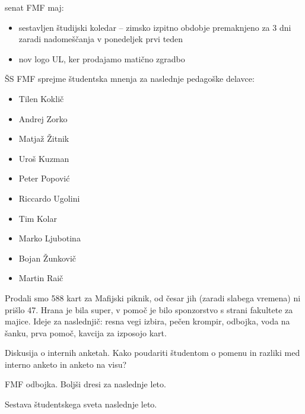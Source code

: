 \documentclass{seja}
\begin{document}
\begin{ad}
\begin{itemize}
    \end{itemize}

    senat FMF maj:

    \begin{itemize}

      \item sestavljen študijski koledar -- zimsko izpitno obdobje premaknjeno za 3 dni zaradi 
      nadomeščanja v ponedeljek prvi teden

      \item nov logo UL, ker prodajamo matično zgradbo

    \end{itemize}

    
    \item

    ŠS FMF sprejme študentska mnenja za naslednje pedagoške delavce:

    \begin{itemize}

      \item Tilen Koklič

      \item Andrej Zorko

      \item Matjaž Žitnik

      \item Uroš Kuzman

      \item Peter Popović

      \item Riccardo Ugolini

      \item Tim Kolar

      \item Marko Ljubotina

      \item Bojan Žunkovič

      \item Martin Raič

    \end{itemize}

    
    \item

    Prodali smo 588 kart za Mafijski piknik, od česar jih (zaradi slabega vremena) ni prišlo 47. 
    Hrana je bila super, v pomoč je bilo sponzorstvo s strani fakultete za majice. Ideje za 
    naslednjič: resna vegi izbira, pečen krompir, odbojka, voda na šanku, prva pomoč, kavcija za 
    izposojo kart.

    
    \item Diskusija o internih anketah. Kako poudariti študentom o pomenu in razliki med interno 
    anketo in anketo na visu?

    
    FMF odbojka. Boljši dresi za naslednje leto.

    
    Sestava študentskega sveta naslednje leto.

  \end{ad}

  
\end{document}
